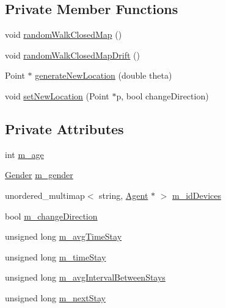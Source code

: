 \subsection*{Private Member Functions}
\begin{DoxyCompactItemize}
\item 
void \mbox{\hyperlink{class_person_a92afed7b9c170806afe8cfe0d46af6af}{random\+Walk\+Closed\+Map}} ()
\item 
void \mbox{\hyperlink{class_person_a43353854c1f8800cb5575d2cab71d720}{random\+Walk\+Closed\+Map\+Drift}} ()
\item 
Point $\ast$ \mbox{\hyperlink{class_person_a3d314ffa374b2c550e09253d041fc67f}{generate\+New\+Location}} (double theta)
\item 
void \mbox{\hyperlink{class_person_a69c7c176dcafd2023b9f43b26cd6de06}{set\+New\+Location}} (Point $\ast$p, bool change\+Direction)
\end{DoxyCompactItemize}
\subsection*{Private Attributes}
\begin{DoxyCompactItemize}
\item 
int \mbox{\hyperlink{class_person_a743e071da10a5ac9150f61df919cfbb4}{m\+\_\+age}}
\item 
\mbox{\hyperlink{class_person_aff84ca16bd4dbf364614d86f20b29dd2}{Gender}} \mbox{\hyperlink{class_person_ade9cdf49acde95c75f19f0b0d24c8c9a}{m\+\_\+gender}}
\item 
unordered\+\_\+multimap$<$ string, \mbox{\hyperlink{class_agent}{Agent}} $\ast$ $>$ \mbox{\hyperlink{class_person_a95b2e60a54b72aea51a7600048e76291}{m\+\_\+id\+Devices}}
\item 
bool \mbox{\hyperlink{class_person_a477ee8a358a38979d379e41072cbd0ac}{m\+\_\+change\+Direction}}
\item 
unsigned long \mbox{\hyperlink{class_person_a8c9502459dd59182d11f60f429b44457}{m\+\_\+avg\+Time\+Stay}}
\item 
unsigned long \mbox{\hyperlink{class_person_a5554109f1f3a7c466f02346d0061c6e7}{m\+\_\+time\+Stay}}
\item 
unsigned long \mbox{\hyperlink{class_person_a62a07c9565931a618a09be7510dde07c}{m\+\_\+avg\+Interval\+Between\+Stays}}
\item 
unsigned long \mbox{\hyperlink{class_person_ad8809184fc32b28b1bcc115b10493b55}{m\+\_\+next\+Stay}}
\end{DoxyCompactItemize}


